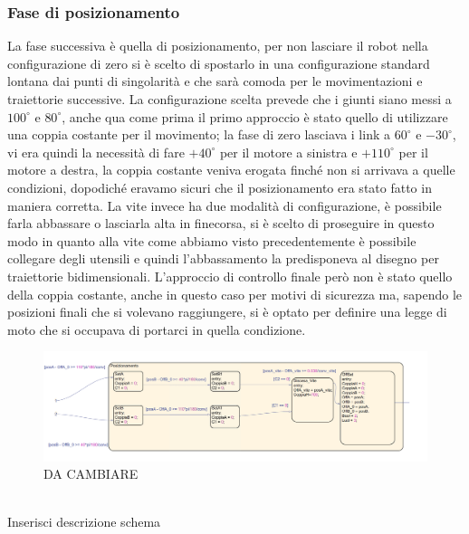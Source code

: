 \subsubsection{Fase di posizionamento}
La fase successiva è quella di posizionamento, per non lasciare il robot nella configurazione di zero si è scelto di spostarlo in una configurazione standard lontana dai punti di singolarità e che sarà comoda per le movimentazioni e traiettorie successive. La configurazione scelta prevede che i giunti siano messi a $100^\circ$ e $80^\circ$, anche qua come prima il primo approccio è stato quello di utilizzare una coppia costante per il movimento; la fase di zero lasciava i link a $60^\circ$ e $-30^\circ$, vi era quindi la necessità di fare $+40^\circ$ per il motore a sinistra e $+110^\circ$ per il motore a destra, la coppia costante veniva erogata finché non si arrivava a quelle condizioni, dopodiché eravamo sicuri che il posizionamento era stato fatto in maniera corretta. La vite invece ha due modalità di configurazione, è possibile farla abbassare o lasciarla alta in finecorsa, si è scelto di proseguire in questo modo in quanto alla vite come abbiamo visto precedentemente è possibile collegare degli utensili e quindi l'abbassamento la predisponeva al disegno per traiettorie bidimensionali. L'approccio di controllo finale però non è stato quello della coppia costante, anche in questo caso per motivi di sicurezza ma, sapendo le posizioni finali che si volevano raggiungere, si è optato per definire una legge di moto che si occupava di portarci in quella condizione.
\begin{figure}[ht]
\begin{center}
    \includegraphics[scale=0.31]{Immagini/Sperimentale/state2.png}
    \caption{DA CAMBIARE}
    \label{fig:Pos}
\end{center}
\end{figure}
\\Inserisci descrizione schema
